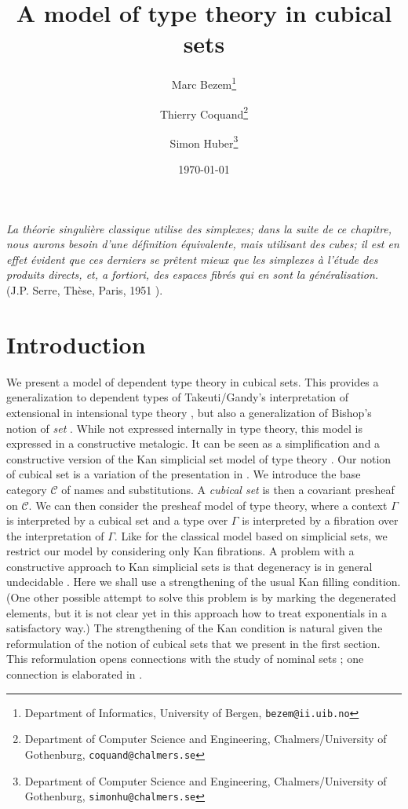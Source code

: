 \documentclass[10pt,a4paper]{article}
\newcommand{\CC}{{\mathcal C}}
\begin{document}
\title{A model of type theory in cubical sets}

\author{
Marc Bezem\thanks{Department of Informatics, University of Bergen, {\tt bezem@ii.uib.no}}
\and
Thierry Coquand\thanks{Department of Computer Science and Engineering, Chalmers/University of Gothenburg, {\tt coquand@chalmers.se}}
\and
Simon Huber\thanks{Department of Computer Science and Engineering, Chalmers/University of Gothenburg, {\tt simonhu@chalmers.se}}
}
\date{\today}
\maketitle


{\em La th\'eorie singuli\`ere classique utilise des {\em simplexes}; dans la suite de ce chapitre,
nous aurons besoin d'une d\'efinition
\'equivalente, mais utilisant des {\em cubes}; il est en effet \'evident que ces derniers se pr\^etent mieux que les
simplexes \`a l'\'etude des produits directs, et, a fortiori, des espaces fibr\'es qui en sont la g\'en\'eralisation.}
(J.P. Serre, Th\`ese, Paris, 1951 \cite{Serre}).


\section*{Introduction}

 We present a model of dependent type theory in cubical sets.
 This provides a generalization to dependent types
of Takeuti/Gandy's interpretation of extensional in intensional type theory \cite{Gandy}, but also
a generalization of Bishop's notion of {\em set} \cite{Bishop}.
While not expressed internally in type theory, this model is expressed in a constructive metalogic.
It can be seen as a simplification and a constructive version of the
Kan simplicial set model of type theory \cite{Voevodsky}.
Our notion of cubical set is a variation of the presentation in \cite{Crans}.
We introduce the base category $\CC$ of names and substitutions.
A \emph{cubical set} is then a covariant presheaf on $\CC$.
We can then consider the presheaf model of type theory,
where a context $\Gamma$ is interpreted by a cubical set and a type over $\Gamma$ is interpreted by a fibration
over the interpretation of $\Gamma$. Like for the classical model based on simplicial sets,
we restrict our model by considering only Kan fibrations. A problem with a constructive approach to
Kan simplicial sets is that degeneracy is in general undecidable \cite{BC}.
Here we shall use a strengthening of the usual Kan filling condition. (One other possible attempt to solve this
problem is by marking the degenerated elements, but it is not clear yet in this approach how to treat exponentials
in a satisfactory way.) The strengthening of the Kan condition is natural given the reformulation of the notion of cubical sets
that we present in the first section. This reformulation opens connections with the study of nominal
sets \cite{pitts}; one connection is elaborated in \cite{Pitts}.
\end{document}
